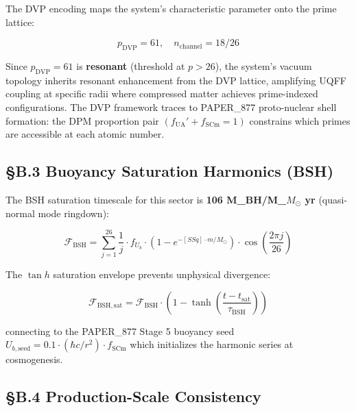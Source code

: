 \documentclass[12pt,a4paper]{article}
\begin{document}
The DVP encoding maps the system's characteristic parameter onto the prime lattice:

\begin{equation}
p_{\mathrm{DVP}} = 61, \quad n_{\mathrm{channel}} = 18/26
\end{equation}

Since $p_{\mathrm{DVP}} = 61$ is \textbf{resonant} (threshold at $p > 26$), the system's vacuum topology inherits resonant enhancement from the DVP lattice, amplifying UQFF coupling at specific radii where compressed matter achieves prime-indexed configurations. The DVP framework traces to PAPER\_877 proto-nuclear shell formation: the DPM proportion pair $(f_{\mathrm{UA}}' + f_{\mathrm{SCm}} = 1)$ constrains which primes are accessible at each atomic number.

\subsection{\S{}B.3 Buoyancy Saturation Harmonics (BSH)}

The BSH saturation timescale for this sector is \textbf{106 M\_BH/M\_{$M_{\odot}$} yr} (quasi-normal mode ringdown):

\begin{equation}
\mathcal{F}_{\mathrm{BSH}} = \sum_{j=1}^{26} \frac{1}{j} \cdot f_U_b \cdot \left(1 - e^{-[SSq] \cdot m/M_\odot}\right) \cdot \cos\!\left(\frac{2\pi j}{26}\right)
\end{equation}

The $\tan h$ saturation envelope prevents unphysical divergence:

\begin{equation}
\mathcal{F}_{\mathrm{BSH,sat}} = \mathcal{F}_{\mathrm{BSH}} \cdot \left(1 - \tanh\!\left(\frac{t - t_{\mathrm{sat}}}{\tau_{\mathrm{BSH}}}\right)\right)
\end{equation}

connecting to the PAPER\_877 Stage 5 buoyancy seed $U_{b,\mathrm{seed}} = 0.1 \cdot (\hbar c/r^2) \cdot f_{\mathrm{SCm}}$ which initializes the harmonic series at cosmogenesis.

\subsection{\S{}B.4 Production-Scale Consistency}
\end{document}
